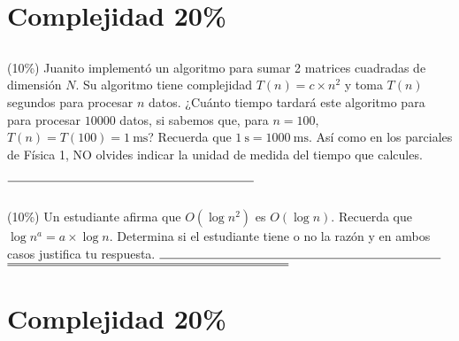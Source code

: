 \documentclass[10 pt]{article}
\begin{document}
\begin{multicols}{2}
\section{Complejidad 20\%}
\subsection{} (10\%) Juanito implementó un algoritmo para sumar 2 matrices cuadradas de dimensión $N$. Su algoritmo tiene complejidad $T(n) = c \times n^2$ y toma $T(n)$ segundos para procesar $n$ datos. ¿Cuánto tiempo tardará este algoritmo para para procesar $10000$ datos, si sabemos que, para $n = 100$, $T(n) = T(100) = \SI{1}{\milli\second}$? Recuerda que $\SI{1}{\second} = \SI{1000}{\milli\second}$. Así como en los parciales de Física 1, NO olvides indicar la unidad de medida del tiempo que calcules.\\ \\
$\rule{7cm}{0.15mm}$
\subsection{} (10\%) Un estudiante afirma que $O(\log n^2)$ es $O(\log n)$. Recuerda que $\log n^a = a \times \log n$. Determina si el estudiante tiene o no la razón y en ambos casos justifica tu respuesta.
$\rule{8cm}{0.15mm}$
$\rule{8cm}{0.15mm}$
$\rule{8cm}{0.15mm}$

\section{Complejidad 20\%}

\end{multicols}
\end{document}
